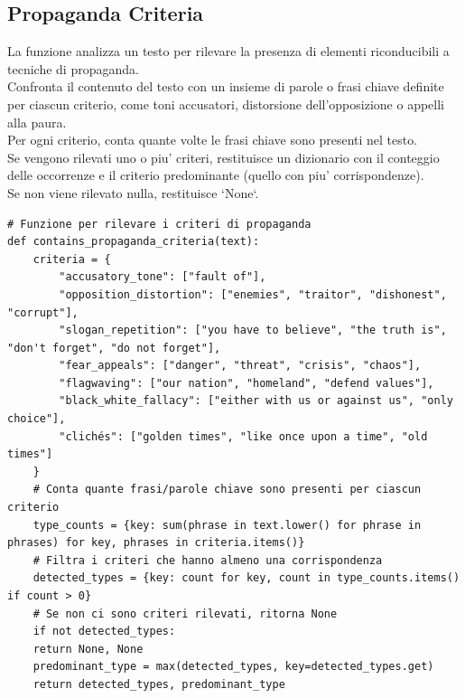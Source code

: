 \documentclass{article}
\begin{document}
		\subsection{Propaganda Criteria}
La funzione analizza un testo per rilevare la presenza di elementi riconducibili a tecniche di propaganda.\\ Confronta il contenuto del testo con un insieme di parole o frasi chiave definite per ciascun criterio, come toni accusatori, distorsione dell’opposizione o appelli alla paura. \\Per ogni criterio, conta quante volte le frasi chiave sono presenti nel testo. \\Se vengono rilevati uno o piu' criteri, restituisce un dizionario con il conteggio delle occorrenze e il criterio predominante (quello con piu' corrispondenze). \\Se non viene rilevato nulla, restituisce `None`.	
	\begin{lstlisting}
# Funzione per rilevare i criteri di propaganda
def contains_propaganda_criteria(text):
	criteria = {
		"accusatory_tone": ["fault of"],
		"opposition_distortion": ["enemies", "traitor", "dishonest", "corrupt"],
		"slogan_repetition": ["you have to believe", "the truth is", "don't forget", "do not forget"],
		"fear_appeals": ["danger", "threat", "crisis", "chaos"],
		"flagwaving": ["our nation", "homeland", "defend values"],
		"black_white_fallacy": ["either with us or against us", "only choice"],
		"clichés": ["golden times", "like once upon a time", "old times"]
	}
	# Conta quante frasi/parole chiave sono presenti per ciascun criterio
	type_counts = {key: sum(phrase in text.lower() for phrase in phrases) for key, phrases in criteria.items()}
	# Filtra i criteri che hanno almeno una corrispondenza
	detected_types = {key: count for key, count in type_counts.items() if count > 0}
	# Se non ci sono criteri rilevati, ritorna None
	if not detected_types:
	return None, None
	predominant_type = max(detected_types, key=detected_types.get)
	return detected_types, predominant_type
	\end{lstlisting}
	\newpage
\end{document}
